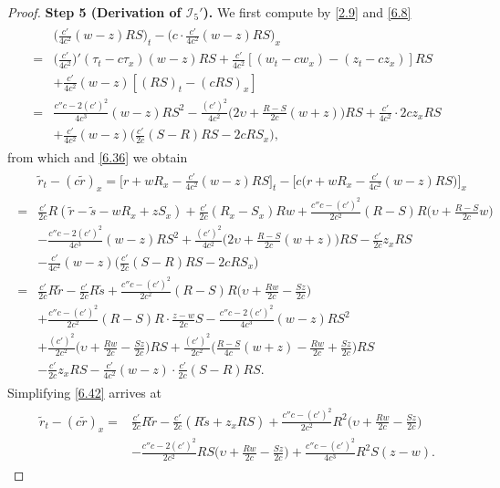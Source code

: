 \documentclass[11pt,reqno]{article}
\newcommand{\fr}{\frac}
\numberwithin{equation}{section}
\begin{document}
\begin{proof}
\textbf{Step 5 (Derivation of $\mathcal{I}_{5}'$).} We first compute by \eqref{2.9} and \eqref{6.8}
\begin{align*}
\begin{split}
&\Big(\fr{c'}{4c^2}(w-z)RS\Big)_t-\Big(c\cdot\fr{c'}{4c^2}(w-z)RS\Big)_x \\
=& \Big(\fr{c'}{4c^2}\Big)' (\tau_t-c\tau_x)(w-z)RS +\fr{c'}{4c^2}[(w_t-cw_x)-(z_t-cz_x)]RS \\ &+\fr{c'}{4c^2}(w-z)[(RS)_t-(cRS)_x] \\
=&\fr{c''c-2(c')^2}{4c^3}(w-z)RS^2 -\fr{(c')^2}{4c^2}\Big(2\upsilon+\fr{R-S}{2c}(w+z)\Big)RS +\fr{c'}{4c^2}\cdot 2cz_xRS \\
&+\fr{c'}{4c^2}(w-z)\Big(\fr{c'}{2c}(S-R)RS-2cRS_x\Big),
\end{split}
\end{align*}
from which and \eqref{6.36} we obtain
\begin{align}\label{6.42}
\begin{split}
&\tilde{r}_t-(c\tilde{r})_x=\Big[r+wR_x-\fr{c'}{4c^2}(w-z)RS\Big]_t -\Big[c\Big(r+wR_x-\fr{c'}{4c^2}(w-z)RS\Big)\Big]_x \\
=& \fr{c'}{2c}R(\tilde{r}-\tilde{s}-wR_x+zS_x) +\fr{c'}{2c}(R_x-S_x)Rw +\fr{c''c-(c')^2}{2c^2}(R-S)R\Big(\upsilon+\fr{R-S}{2c}w\Big) \\
&-\fr{c''c-2(c')^2}{4c^3}(w-z)RS^2 +\fr{(c')^2}{4c^2}\Big(2\upsilon+\fr{R-S}{2c}(w+z)\Big)RS -\fr{c'}{2c}z_xRS \\
&-\fr{c'}{4c^2}(w-z)\Big(\fr{c'}{2c}(S-R)RS-2cRS_x\Big) \\
=& \fr{c'}{2c}R\tilde{r}-\fr{c'}{2c}R\tilde{s}  +\fr{c''c-(c')^2}{2c^2}(R-S)R\Big(\upsilon+\fr{Rw}{2c}-\fr{Sz}{2c}\Big)  \\
&+\fr{c''c-(c')^2}{2c^2}(R-S)R \cdot\fr{z-w}{2c}S  -\fr{c''c-2(c')^2}{4c^3}(w-z)RS^2 \\
&+\fr{(c')^2}{2c^2}\Big(\upsilon+\fr{Rw}{2c}- \fr{Sz}{2c}\Big)RS+\fr{(c')^2}{2c^2}\Big(\fr{R-S}{4c}(w+z)-\fr{Rw}{2c}+ \fr{Sz}{2c}\Big)RS \\
&-\fr{c'}{2c}z_xRS-\fr{c'}{4c^2}(w-z)\cdot\fr{c'}{2c}(S-R)RS.
\end{split}
\end{align}
Simplifying \eqref{6.42} arrives at
\begin{align}\label{6.43}
\begin{split}
\tilde{r}_t-(c\tilde{r})_x
=& \fr{c'}{2c}R\tilde{r} -\fr{c'}{2c}(R\tilde{s}+ z_xRS) +\fr{c''c-(c')^2}{2c^2}R^2\Big(\upsilon+\fr{Rw}{2c}-\fr{Sz}{2c}\Big) \\ &-\fr{c''c-2(c')^2}{2c^2}RS\Big(\upsilon+\fr{Rw}{2c}-\fr{Sz}{2c}\Big) +\fr{c''c-(c')^2}{4c^3}R^2S(z-w).

\end{split}
\end{align}
\end{proof}
\end{document}
